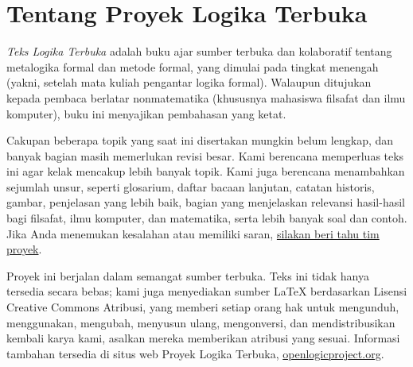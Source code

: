 \chapter*{Tentang Proyek Logika Terbuka}


\textit{Teks Logika Terbuka} adalah buku ajar sumber terbuka dan
kolaboratif tentang metalogika formal dan metode formal, yang dimulai pada
tingkat menengah (yakni, setelah mata kuliah pengantar logika formal).
Walaupun ditujukan kepada pembaca berlatar nonmatematika (khususnya mahasiswa
filsafat dan ilmu komputer), buku ini menyajikan pembahasan yang ketat.

Cakupan beberapa topik yang saat ini disertakan mungkin belum lengkap, dan
banyak bagian masih memerlukan revisi besar. Kami berencana memperluas teks
ini agar kelak mencakup lebih banyak topik. Kami juga berencana menambahkan
sejumlah unsur, seperti glosarium, daftar bacaan lanjutan, catatan historis,
gambar, penjelasan yang lebih baik, bagian yang menjelaskan relevansi
hasil-hasil bagi filsafat, ilmu komputer, dan matematika, serta lebih banyak
soal dan contoh. Jika Anda menemukan kesalahan atau memiliki saran,
\href{https://github.com/OpenLogicProject/OpenLogic/wiki/Contributing}{silakan
beri tahu tim proyek}.

Proyek ini berjalan dalam semangat sumber terbuka. Teks ini tidak hanya
tersedia secara bebas; kami juga menyediakan sumber LaTeX berdasarkan
Lisensi Creative Commons Atribusi, yang memberi setiap orang hak untuk
mengunduh, menggunakan, mengubah, menyusun ulang, mengonversi, dan
mendistribusikan kembali karya kami, asalkan mereka memberikan atribusi yang
sesuai. Informasi tambahan tersedia di situs web Proyek Logika Terbuka,
\href{http://openlogicproject.org/}{openlogicproject.org}.
